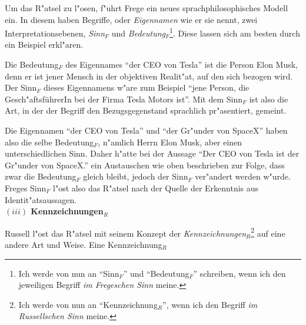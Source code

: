 \documentclass[a4paper, emulatestandardclasses, 12pt]{scrartcl}
\begin{document}
\begin{onehalfspace}
Um das R"atsel zu l"osen, f"uhrt Frege ein neues sprachphilosophisches Modell ein. In diesem haben Begriffe, oder \emph{Eigennamen} wie er sie nennt, zwei Interpretationsebenen, \emph{Sinn$_{F}$} und \emph{Bedeutung$_{F}$}\footnote{Ich werde von nun an "`Sinn$_{F}$"' und "`Bedeutung$_{F}$"' schreiben, wenn ich den jeweiligen Begriff \emph{im Fregeschen Sinn} meine.}. Diese lassen sich am besten durch ein Beispiel erkl"aren.

Die Bedeutung$_{F}$ des Eigennames "`der CEO von Tesla"' ist die Person Elon Musk, denn er ist jener Mensch in der objektiven Realit"at, auf den sich bezogen wird. Der Sinn$_{F}$ dieses Eigennamens w"are zum Beispiel  "`jene Person, die Gesch"aftsführerIn bei der Firma Tesla Motors ist"'. Mit dem Sinn$_{F}$ ist also die Art, in der der Begriff den Bezugsgegenstand sprachlich pr"asentiert, gemeint.

Die Eigennamen "`der CEO von Tesla"' und "`der Gr"under von SpaceX"' haben also die selbe Bedeutung$_{F}$, n"amlich Herrn Elon Musk, aber einen unterschiedlichen Sinn. Daher h"atte bei der Aussage "`Der CEO von Tesla ist der Gr"under von SpaceX."' ein Austauschen wie oben beschrieben zur Folge, dass zwar die Bedeutung$_{F}$ gleich bleibt, jedoch der Sinn$_{F}$ ver"andert werden w"urde. Freges Sinn$_{F}$ l"ost also das R"atsel nach der Quelle der Erkenntnis aus Identit"atsaussagen.
\\\noindent\textbf{$(iii)$ Kennzeichnungen$_{R}$}	

Russell l"ost das R"atsel mit seinem Konzept der \emph{Kennzeichnungen}$_{R}$\footnote{Ich werde von nun an "`Kennzeichnung$_{R}$"', wenn ich den Begriff \emph{im Russellschen Sinn} meine.} auf eine andere Art und Weise. Eine Kennzeichnung$_{R}$ 

\end{onehalfspace}


\end{document}
